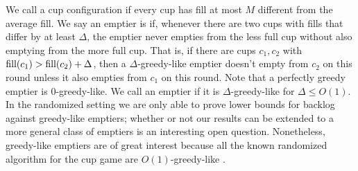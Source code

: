 
We call a cup configuration  if every cup has fill
at most $M$ different from the average fill.
We say an emptier is 
if, whenever there are two cups with fills that differ
by at least $\Delta$, the emptier never empties from the less full
cup without also emptying from the more full cup. That is, if
there are cups $c_1, c_2$ with $\operatorname{\textnormal{fill}}(c_1) > \operatorname{\textnormal{fill}}(c_2) + \Delta$,
then a $\Delta$-greedy-like emptier doesn't empty from $c_2$ on
this round unless it also empties from $c_1$ on this round.
Note that a perfectly greedy
emptier is $0$-greedy-like. We call an emptier  if it is
$\Delta$-greedy-like for $\Delta \le O(1)$.
In the randomized setting we are only able to prove lower bounds for backlog
against greedy-like emptiers; whether or not our results can be extended to a
more general class of emptiers is an interesting open question. 
Nonetheless, greedy-like emptiers are of great interest because
all the known randomized algorithm for the cup game are
$O(1)$-greedy-like \cite{mbe19, wku20}.


